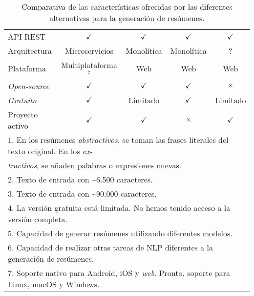 \begin{table}[h]
\begin{tabular}{lcccc}
		\small{API REST} & \cellcolor{green!25} {$\checkmark$} & \cellcolor{green!25} {$\checkmark$} & \cellcolor{green!25} {$\checkmark$} & \cellcolor{green!25} {$\checkmark$} \\
		\small{Arquitectura} & {\small Microservicios} & {\small Monolítica} & {\small Monolítica} & ? \\
		\small{Plataforma} & \scriptsize{Multiplataforma$^7$} & {\small Web} & {\small Web} & {\small Web} \\
		\emph{Open-source} & \cellcolor{green!25} {$\checkmark$}& \cellcolor{green!25} {$\checkmark$} & \cellcolor{green!25} {$\checkmark$} & \cellcolor{red!25} $\times$ \\
		\emph{Gratuito} & \cellcolor{green!25} {$\checkmark$}& \cellcolor{yellow!25} \small{Limitado} & \cellcolor{green!25} {$\checkmark$} & \cellcolor{yellow!25} \small{Limitado} \\
		\small{Proyecto activo} & \cellcolor{green!25} {$\checkmark$}& \cellcolor{green!25} {$\checkmark$} & \cellcolor{red!25} $\times$ & \cellcolor{green!25} {$\checkmark$} \\
		\bottomrule
		\multicolumn{5}{l}{\scriptsize{1. En los resúmenes \emph{abstractivos}, se toman las frases literales del texto original. En los \emph{ex-}}} \\
		\multicolumn{5}{l}{\hspace{0.26cm} \scriptsize{\emph{tractivos}, se añaden palabras o expresiones nuevas.}} \\
		\multicolumn{5}{l}{\scriptsize{2. Texto de entrada con \textasciitilde 6.500 caracteres.}} \\
		\multicolumn{5}{l}{\scriptsize{3. Texto de entrada con \textasciitilde 90.000 caracteres.}} \\
		\multicolumn{5}{l}{\scriptsize{4. La versión gratuita está limitada. No hemos tenido acceso a la versión completa.}} \\
		\multicolumn{5}{l}{\scriptsize{5. Capacidad de generar resúmenes utilizando diferentes modelos.}} \\
		\multicolumn{5}{l}{\scriptsize{6. Capacidad de realizar otras tareas de NLP diferentes a la generación de resúmenes.}} \\
		\multicolumn{5}{l}{\scriptsize{7. Soporte nativo para Android, iOS y \emph{web}. Pronto, soporte para Linux, macOS y Windows.}} \\
		\bottomrule
	\end{tabular}	
	\caption{Comparativa de las características ofrecidas por las diferentes alternativas para la generación de resúmenes.}
\end{table}


